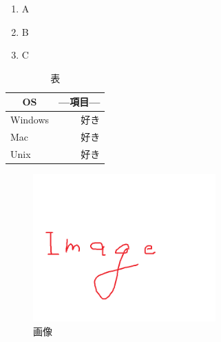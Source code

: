 \documentclass{bxjsarticle}
\begin{document}
%

\begin{enumerate}
  \item A
  \item B
  \item C
\end{enumerate}

\begin{table}[htb]
  \centering
  \caption{表}
  \begin{tabular}{|l|r|}\hline
   \multicolumn{1}{|c|}{OS} & \multicolumn{1}{|c|}{---項目---} \\ \hline \hline
    Windows  & 好き \\  \hline
    Mac      & 好き \\  \hline
    Unix     & 好き \\  \hline

  \end{tabular}
\end{table}

\begin{figure}[H]
  \centering
  \includegraphics[width=7cm]{image.jpg}
  \caption{画像} \label{fig:image}
\end{figure}
\end{document}
